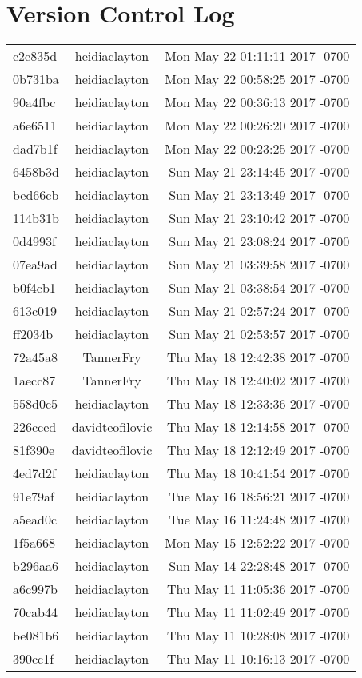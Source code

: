 \documentclass{article}
\begin{document}
\section*{Version Control Log}
\begin{tabular}{ l | c | r }
  \hline	
 c2e835d &	heidiaclayton     &	Mon May 22 01:11:11 2017 -0700 \\
0b731ba &	heidiaclayton     &	Mon May 22 00:58:25 2017 -0700 \\
90a4fbc &	heidiaclayton     &	Mon May 22 00:36:13 2017 -0700 \\
a6e6511 &	heidiaclayton     &	Mon May 22 00:26:20 2017 -0700 \\
dad7b1f &	heidiaclayton     &	Mon May 22 00:23:25 2017 -0700 \\
6458b3d &	heidiaclayton     &	Sun May 21 23:14:45 2017 -0700 \\
bed66cb &	heidiaclayton     &	Sun May 21 23:13:49 2017 -0700 \\
114b31b &	heidiaclayton     &	Sun May 21 23:10:42 2017 -0700 \\
0d4993f &	heidiaclayton     &	Sun May 21 23:08:24 2017 -0700 \\
07ea9ad &	heidiaclayton     &	Sun May 21 03:39:58 2017 -0700 \\
b0f4cb1 &	heidiaclayton     &	Sun May 21 03:38:54 2017 -0700 \\
613c019 &	heidiaclayton     &	Sun May 21 02:57:24 2017 -0700 \\
ff2034b &	heidiaclayton     &	Sun May 21 02:53:57 2017 -0700 \\
72a45a8 &	TannerFry         &	Thu May 18 12:42:38 2017 -0700 \\
1aecc87 &	TannerFry         &	Thu May 18 12:40:02 2017 -0700 \\
558d0c5 &	heidiaclayton     &	Thu May 18 12:33:36 2017 -0700 \\
226cced &	davidteofilovic	  & Thu May 18 12:14:58 2017 -0700 \\
81f390e &	davidteofilovic   &	Thu May 18 12:12:49 2017 -0700 \\
4ed7d2f &	heidiaclayton     &	Thu May 18 10:41:54 2017 -0700 \\
91e79af &	heidiaclayton     &	Tue May 16 18:56:21 2017 -0700 \\
a5ead0c &	heidiaclayton     &	Tue May 16 11:24:48 2017 -0700 \\
1f5a668 &	heidiaclayton     &	Mon May 15 12:52:22 2017 -0700 \\
b296aa6 &	heidiaclayton     &	Sun May 14 22:28:48 2017 -0700 \\
a6c997b &	heidiaclayton     &	Thu May 11 11:05:36 2017 -0700 \\
70cab44 &	heidiaclayton     &	Thu May 11 11:02:49 2017 -0700 \\
be081b6 &	heidiaclayton     &	Thu May 11 10:28:08 2017 -0700 \\
390cc1f &	heidiaclayton     &	Thu May 11 10:16:13 2017 -0700 \\ 
   \hline  
\end{tabular}
\end{document}
